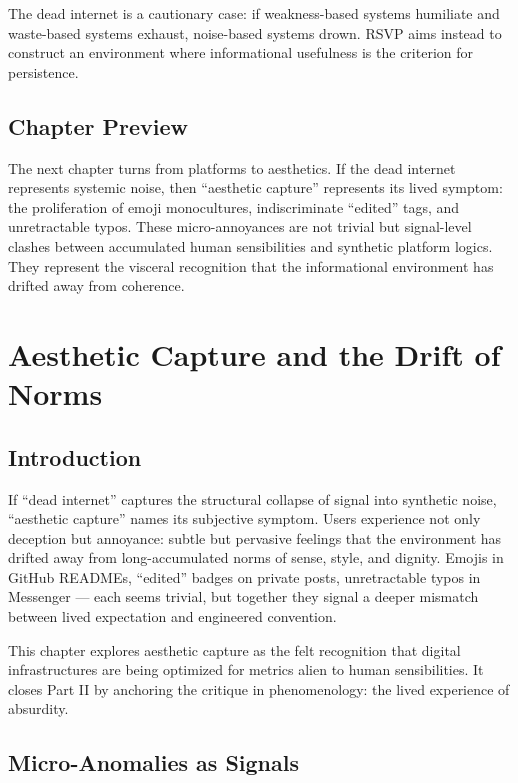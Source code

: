 \documentclass{book}
\begin{document}
The dead internet is a cautionary case: if weakness-based systems humiliate and waste-based systems exhaust, noise-based systems drown. RSVP aims instead to construct an environment where informational usefulness is the criterion for persistence.

\section{Chapter Preview}

The next chapter turns from platforms to aesthetics. If the dead internet represents systemic noise, then “aesthetic capture” represents its lived symptom: the proliferation of emoji monocultures, indiscriminate “edited” tags, and unretractable typos. These micro-annoyances are not trivial but signal-level clashes between accumulated human sensibilities and synthetic platform logics. They represent the visceral recognition that the informational environment has drifted away from coherence.

\chapter{Aesthetic Capture and the Drift of Norms}

\section{Introduction}

If “dead internet” captures the structural collapse of signal into synthetic noise, “aesthetic capture” names its subjective symptom. Users experience not only deception but annoyance: subtle but pervasive feelings that the environment has drifted away from long-accumulated norms of sense, style, and dignity. Emojis in GitHub READMEs, “edited” badges on private posts, unretractable typos in Messenger — each seems trivial, but together they signal a deeper mismatch between lived expectation and engineered convention.

This chapter explores aesthetic capture as the felt recognition that digital infrastructures are being optimized for metrics alien to human sensibilities. It closes Part II by anchoring the critique in phenomenology: the lived experience of absurdity.

\section{Micro-Anomalies as Signals}
\end{document}
